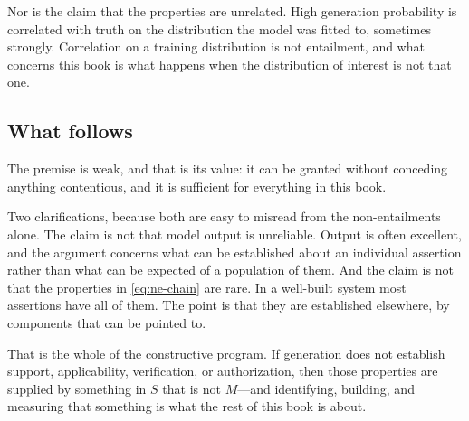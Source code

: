 Nor is the claim that the properties are unrelated. High generation probability is
correlated with truth on the distribution the model was fitted to, sometimes
strongly. Correlation on a training distribution is not entailment, and what concerns this
book is what happens when the distribution of interest is not that one.

\subsection{What follows}

The premise is weak, and that is its value: it can be granted without conceding
anything contentious, and it is sufficient for everything in this book.

Two clarifications, because both are easy to misread from the non-entailments
alone. The claim is not that model output is unreliable. Output is often excellent,
and the argument concerns what can be established about an individual assertion
rather than what can be expected of a population of them. And the claim is not that
the properties in \eqref{eq:ne-chain} are rare. In a well-built system most
assertions have all of them. The point is that they are established elsewhere, by
components that can be pointed to.

That is the whole of the constructive program. If generation does not establish
support, applicability, verification, or authorization, then those properties are
supplied by something in $S$ that is not $M$---and identifying, building, and
measuring that something is what the rest of this book is about.
